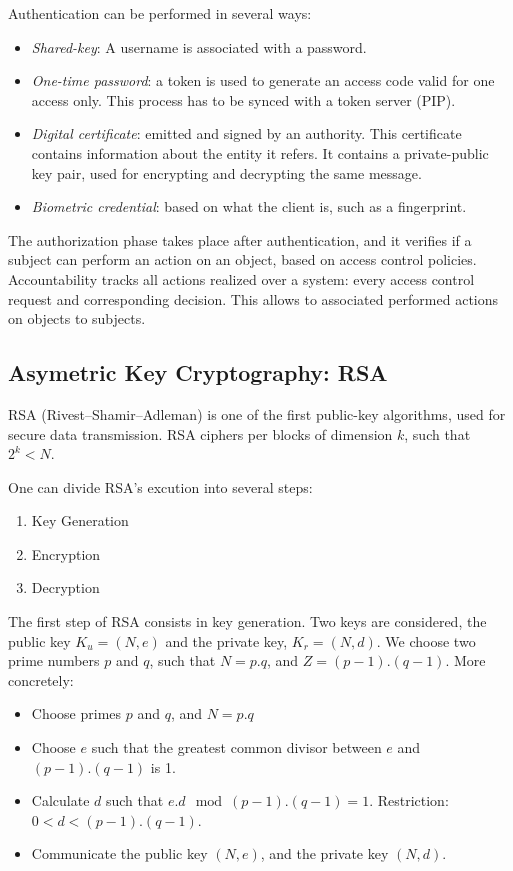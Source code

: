 \documentclass[12pt,a4paper]{article}
\theoremstyle{definition}
\begin{document}
Authentication can be performed in several ways: \begin{itemize}
\item \textit{Shared-key}: A username is associated with a password. 
\item \textit{One-time password}: a token is used to generate an access code valid for one access only. This process has to be synced with a token server (PIP). 
\item \textit{Digital certificate}: emitted and signed by an authority. This certificate contains information about the entity it refers. It contains a private-public key pair, used for encrypting and decrypting the same message. 
\item \textit{Biometric credential}: based on what the client is, such as a fingerprint.
\end{itemize}

The authorization phase takes place after authentication, and it verifies if a subject can perform an action on an object, based on access control policies. Accountability tracks all actions realized over a system: every access control request and corresponding decision. This allows to associated performed actions on objects to subjects. 

\subsection{Asymetric Key Cryptography: RSA}
RSA (Rivest–Shamir–Adleman) is one of the first public-key algorithms, used for secure data transmission.  RSA ciphers per blocks of dimension $k$, such that $2^k< N$. 

One can divide RSA's excution into several steps:
\begin{enumerate}
    \item Key Generation
    \item Encryption
    \item Decryption
\end{enumerate}

The first step of RSA consists in key generation. Two keys are considered, the public key $K_u = (N,e)$ and the private key, $K_r = (N,d)$. We choose two prime numbers $p$ and $q$, such that $N = p.q$, and $Z = (p - 1).(q - 1)$. More concretely:
\begin{itemize}
    \item Choose primes $p$ and $q$, and $N = p.q$
    \item Choose $e$ such that the greatest common divisor between $e$ and $(p-1).(q-1)$ is 1.
    \item Calculate $d$ such that $e.d \mod (p - 1).(q - 1) = 1$. Restriction: $0 < d < (p - 1).(q - 1)$.
    \item Communicate the public key $(N,e)$, and the private key $(N,d)$.
\end{itemize}
\end{document}
